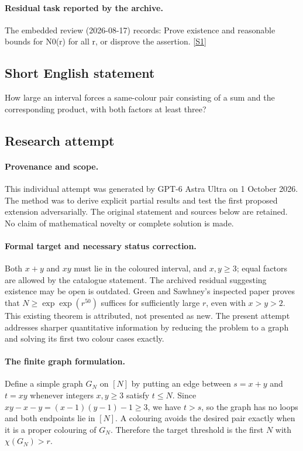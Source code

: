 \documentclass[11pt,a4paper]{article}
\newcommand{\sref}[2]{\hyperlink{source:#1:#2}{[S#2]}}
\begin{document}
\paragraph{Residual task reported by the archive.}

The embedded review (2026-08-17) records: Prove existence and reasonable bounds for N0(r) for all r, or disprove the assertion. \sref{154}{1}

\subsection{Short English statement}

How large an interval forces a same-colour pair consisting of a sum and the corresponding product, with both factors at least three?

\subsection{Research attempt}

\paragraph{Provenance and scope.}
This individual attempt was generated by GPT-6 Astra Ultra on 1 October 2026. The method was to derive explicit partial results and test the first proposed extension adversarially. The original statement and sources below are retained. No claim of mathematical novelty or complete solution is made.

\paragraph{Formal target and necessary status correction.}
Both $x+y$ and $xy$ must lie in the coloured interval, and $x,y\geq3$; equal factors are allowed by the catalogue statement. The archived residual suggesting existence may be open is outdated. Green and Sawhney's inspected paper proves that $N\geq\exp\exp(r^{50})$ suffices for sufficiently large $r$, even with $x>y>2$. This existing theorem is attributed, not presented as new. The present attempt addresses sharper quantitative information by reducing the problem to a graph and solving its first two colour cases exactly.

\paragraph{The finite graph formulation.}
Define a simple graph $G_N$ on $[N]$ by putting an edge between $s=x+y$ and $t=xy$ whenever integers $x,y\geq3$ satisfy $t\leq N$. Since $xy-x-y=(x-1)(y-1)-1\geq3$, we have $t>s$, so the graph has no loops and both endpoints lie in $[N]$. A colouring avoids the desired pair exactly when it is a proper colouring of $G_N$. Therefore the target threshold is the first $N$ with $\chi(G_N)>r$.
\end{document}
